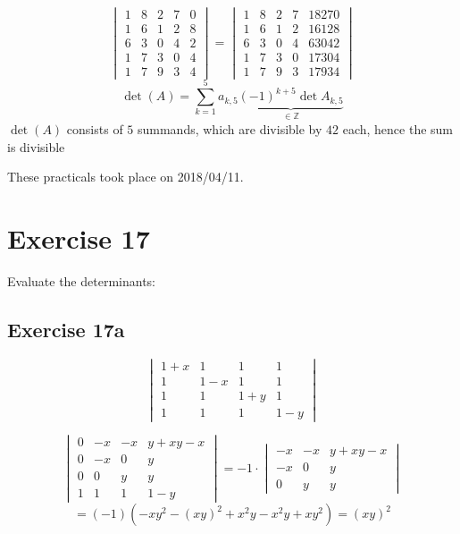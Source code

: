 \documentclass[a4paper]{article}
\theoremstyle{definition}
\newcommand\dateref[1]{These practicals took place on #1.\par}
\begin{document}
\[
  \begin{vmatrix}
    1 & 8 & 2 & 7 & 0 \\
    1 & 6 & 1 & 2 & 8 \\
    6 & 3 & 0 & 4 & 2 \\
    1 & 7 & 3 & 0 & 4 \\
    1 & 7 & 9 & 3 & 4
  \end{vmatrix}
  =
  \begin{vmatrix}
    1 & 8 & 2 & 7 & 18270 \\
    1 & 6 & 1 & 2 & 16128 \\
    6 & 3 & 0 & 4 & 63042 \\
    1 & 7 & 3 & 0 & 17304 \\
    1 & 7 & 9 & 3 & 17934
  \end{vmatrix}
\]
\[
  \det(A) = \sum_{k=1}^5 a_{k,5} \underbrace{(-1)^{k+5} \det{A_{k,5}}}_{\in \mathbb Z}
\]
$\det(A)$ consists of $5$ summands, which are divisible by $42$ each, hence the sum is divisible 

\dateref{2018/04/11}

\section{Exercise 17}
\begin{ex}
  Evaluate the determinants:
\end{ex}

\subsection{Exercise 17a}
\begin{ex}
  \[
    \begin{vmatrix}
      1+x & 1 & 1 & 1 \\
      1 & 1-x & 1 & 1 \\
      1 & 1 & 1+y & 1 \\
      1 & 1 & 1 & 1-y
    \end{vmatrix}
  \]
\end{ex}

\[
  \begin{vmatrix}
    0 & -x & -x & y+xy-x \\
    0 & -x & 0 & y \\
    0 & 0 & y & y \\
    1 & 1 & 1 & 1-y
  \end{vmatrix}
  =
  -1 \cdot
  \begin{vmatrix}
    -x & -x & y+xy-x \\
    -x & 0 & y \\
    0 & y & y
  \end{vmatrix}
\] \[
  = (-1) (-xy^2 - (xy)^2 + x^2y - x^2y + xy^2)
  = (xy)^2
\]
\end{document}
